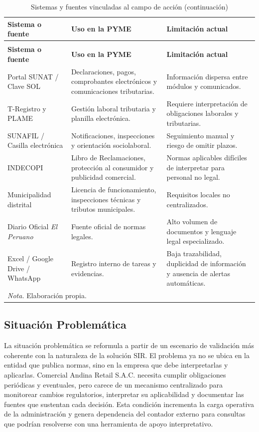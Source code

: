 \documentclass[12pt,a4paper,oneside]{report}
\begin{document}
\begin{longtable}{@{}p{}p{}p{}@{}}
\caption{Sistemas y fuentes vinculadas al campo de acción}\label{tab:sistemas-fuentes-campo}\\
\toprule
\textbf{Sistema o fuente} & \textbf{Uso en la PYME} & \textbf{Limitación actual} \\
\midrule
\endfirsthead
\caption[]{Sistemas y fuentes vinculadas al campo de acción (continuación)}\\
\toprule
\textbf{Sistema o fuente} & \textbf{Uso en la PYME} & \textbf{Limitación actual} \\
\midrule
\endhead
Portal SUNAT / Clave SOL & Declaraciones, pagos, comprobantes electrónicos y comunicaciones tributarias. & Información dispersa entre módulos y comunicados. \\
T-Registro y PLAME & Gestión laboral tributaria y planilla electrónica. & Requiere interpretación de obligaciones laborales y tributarias. \\
SUNAFIL / Casilla electrónica & Notificaciones, inspecciones y orientación sociolaboral. & Seguimiento manual y riesgo de omitir plazos. \\
INDECOPI & Libro de Reclamaciones, protección al consumidor y publicidad comercial. & Normas aplicables difíciles de interpretar para personal no legal. \\
Municipalidad distrital & Licencia de funcionamiento, inspecciones técnicas y tributos municipales. & Requisitos locales no centralizados. \\
Diario Oficial \textit{El Peruano} & Fuente oficial de normas legales. & Alto volumen de documentos y lenguaje legal especializado. \\
Excel / Google Drive / WhatsApp & Registro interno de tareas y evidencias. & Baja trazabilidad, duplicidad de información y ausencia de alertas automáticas. \\
\bottomrule
\multicolumn{3}{p{0.94\textwidth}}{\normalsize \textit{Nota.} Elaboración propia.}\\
\end{longtable}

\subsection{Situación Problemática}\label{subsec:situacion-problematica}

La situación problemática se reformula a partir de un escenario de validación más coherente con la naturaleza de la solución SIR. El problema ya no se ubica en la entidad que publica normas, sino en la empresa que debe interpretarlas y aplicarlas. Comercial Andina Retail S.A.C. necesita cumplir obligaciones periódicas y eventuales, pero carece de un mecanismo centralizado para monitorear cambios regulatorios, interpretar su aplicabilidad y documentar las fuentes que sustentan cada decisión. Esta condición incrementa la carga operativa de la administración y genera dependencia del contador externo para consultas que podrían resolverse con una herramienta de apoyo interpretativo.
\end{document}
